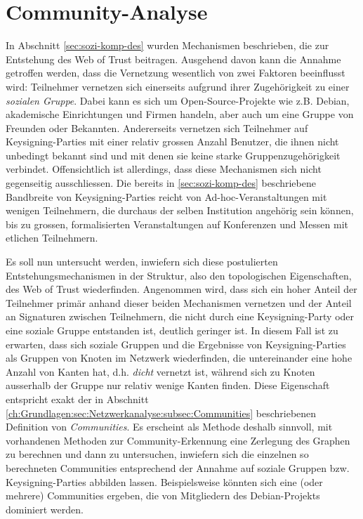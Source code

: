 \section{Community-Analyse}
\label{sec:community-analyse}

In Abschnitt \ref{sec:sozi-komp-des} wurden Mechanismen beschrieben,
die zur Entstehung des Web of Trust beitragen. Ausgehend davon kann
die Annahme getroffen werden, dass die Vernetzung wesentlich von zwei
Faktoren beeinflusst wird: Teilnehmer vernetzen sich einerseits
aufgrund ihrer Zugeh\"origkeit zu einer \emph{sozialen Gruppe}. Dabei
kann es sich um Open-Source-Projekte wie z.B. Debian, akademische
Einrichtungen und Firmen handeln, aber auch um eine Gruppe von
Freunden oder Bekannten. Andererseits vernetzen sich Teilnehmer auf
Keysigning-Parties mit einer relativ grossen Anzahl Benutzer, die
ihnen nicht unbedingt bekannt sind und mit denen sie keine starke
Gruppenzugeh\"origkeit verbindet. Offensichtlich ist allerdings, dass
diese Mechanismen sich nicht gegenseitig ausschliessen. Die bereits in
\ref{sec:sozi-komp-des} beschriebene Bandbreite von Keysigning-Parties
reicht von Ad-hoc-Veranstaltungen mit wenigen Teilnehmern, die
durchaus der selben Institution angeh\"orig sein k\"onnen, bis zu
grossen, formalisierten Veranstaltungen auf Konferenzen und Messen mit
etlichen Teilnehmern.

Es soll nun untersucht werden, inwiefern sich diese postulierten
Entstehungsmechanismen in der Struktur, also den topologischen
Eigenschaften, des Web of Trust wiederfinden. Angenommen wird, dass
sich ein hoher Anteil der Teilnehmer prim\"ar anhand dieser beiden
Mechanismen vernetzen und der Anteil an Signaturen zwischen
Teilnehmern, die nicht durch eine Keysigning-Party oder eine soziale
Gruppe entstanden ist, deutlich geringer ist. In diesem Fall ist zu
erwarten, dass sich soziale Gruppen und die Ergebnisse von
Keysigning-Parties als Gruppen von Knoten im Netzwerk wiederfinden,
die untereinander eine hohe Anzahl von Kanten hat, d.h. \emph{dicht}
vernetzt ist, w\"ahrend sich zu Knoten ausserhalb der Gruppe nur
relativ wenige Kanten finden. Diese Eigenschaft entspricht exakt der
in Abschnitt
\ref{ch:Grundlagen:sec:Netzwerkanalyse:subsec:Communities}
beschriebenen Definition von \emph{Communities}. Es erscheint als
Methode deshalb sinnvoll, mit vorhandenen Methoden zur
Community-Erkennung eine Zerlegung des Graphen zu berechnen und dann
zu untersuchen, inwiefern sich die einzelnen so berechneten
Communities entsprechend der Annahme auf soziale Gruppen
bzw. Keysigning-Parties abbilden lassen. Beispielsweise k\"onnten sich
eine (oder mehrere) Communities ergeben, die von Mitgliedern des
Debian-Projekts dominiert werden.

